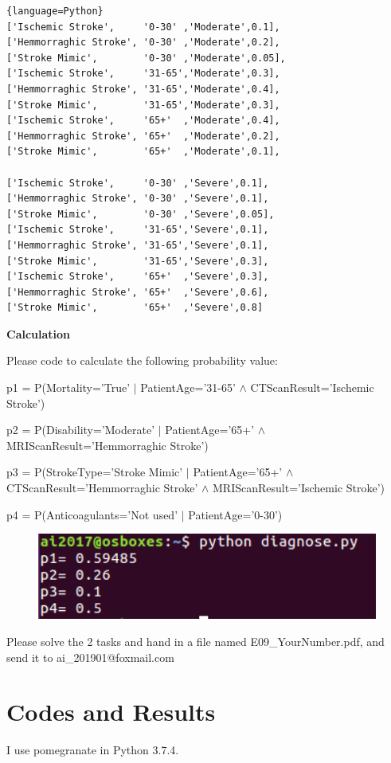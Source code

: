 \documentclass[a4paper, 11pt]{article}
\begin{document}
\begin{lstlisting}{language=Python}
['Ischemic Stroke',     '0-30' ,'Moderate',0.1],
['Hemmorraghic Stroke', '0-30' ,'Moderate',0.2],
['Stroke Mimic',        '0-30' ,'Moderate',0.05],
['Ischemic Stroke',     '31-65','Moderate',0.3],
['Hemmorraghic Stroke', '31-65','Moderate',0.4],
['Stroke Mimic',        '31-65','Moderate',0.3],
['Ischemic Stroke',     '65+'  ,'Moderate',0.4],
['Hemmorraghic Stroke', '65+'  ,'Moderate',0.2],
['Stroke Mimic',        '65+'  ,'Moderate',0.1],

['Ischemic Stroke',     '0-30' ,'Severe',0.1],
['Hemmorraghic Stroke', '0-30' ,'Severe',0.1],
['Stroke Mimic',        '0-30' ,'Severe',0.05],
['Ischemic Stroke',     '31-65','Severe',0.1],
['Hemmorraghic Stroke', '31-65','Severe',0.1],
['Stroke Mimic',        '31-65','Severe',0.3],
['Ischemic Stroke',     '65+'  ,'Severe',0.3],
['Hemmorraghic Stroke', '65+'  ,'Severe',0.6],
['Stroke Mimic',        '65+'  ,'Severe',0.8]
\end{lstlisting}
\textbf{Calculation}

Please code to calculate the following probability value:

p1 = P(Mortality='True' $|$ PatientAge='31-65' $\land$ CTScanResult='Ischemic Stroke')

p2 = P(Disability='Moderate' $|$ PatientAge='65+' $\land$  MRIScanResult='Hemmorraghic Stroke')

p3 = P(StrokeType='Stroke Mimic' $|$ PatientAge='65+' $\land$ CTScanResult='Hemmorraghic Stroke' $\land$ MRIScanResult='Ischemic Stroke')

p4 = P(Anticoagulants='Not used' $|$ PatientAge='0-30')

\begin{figure}[ht]
\centering
\includegraphics[width=12cm]{Pic/diagnose_result}
\end{figure}

Please solve the 2 tasks and hand in a file named \textsf{E09\_YourNumber.pdf}, and send it to \textsf{ai\_201901@foxmail.com}


\section{Codes and Results}
I use pomegranate in Python 3.7.4.
\end{document}
